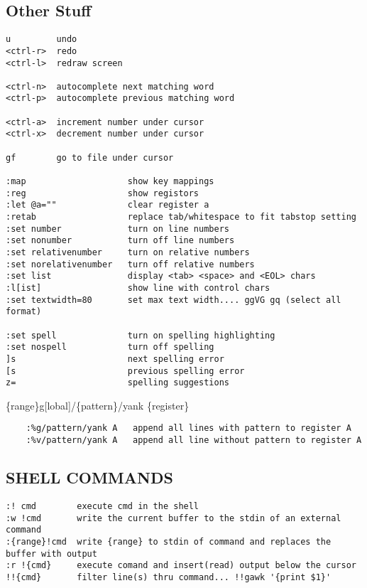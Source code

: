 \documentclass{article}
\begin{document}
\newpage

\subsection{Other Stuff}\label{other-stuff}

\begin{verbatim}
u         undo
<ctrl-r>  redo 
<ctrl-l>  redraw screen

<ctrl-n>  autocomplete next matching word
<ctrl-p>  autocomplete previous matching word

<ctrl-a>  increment number under cursor
<ctrl-x>  decrement number under cursor

gf        go to file under cursor

:map                    show key mappings
:reg                    show registors
:let @a=""              clear register a
:retab                  replace tab/whitespace to fit tabstop setting
:set number             turn on line numbers
:set nonumber           turn off line numbers
:set relativenumber     turn on relative numbers
:set norelativenumber   turn off relative numbers
:set list               display <tab> <space> and <EOL> chars
:l[ist]                 show line with control chars
:set textwidth=80       set max text width.... ggVG gq (select all format)

:set spell              turn on spelling highlighting
:set nospell            turn off spelling
]s                      next spelling error 
[s                      previous spelling error
z=                      spelling suggestions
\end{verbatim}

\{range\}g{[}lobal{]}/\{pattern\}/yank \{register\}

\begin{verbatim}
    :%g/pattern/yank A   append all lines with pattern to register A
    :%v/pattern/yank A   append all line without pattern to register A
\end{verbatim}

\subsection{SHELL COMMANDS}\label{shell-commands}

\begin{verbatim}
:! cmd        execute cmd in the shell
:w !cmd       write the current buffer to the stdin of an external command
:{range}!cmd  write {range} to stdin of command and replaces the buffer with output
:r !{cmd}     execute comand and insert(read) output below the cursor
!!{cmd}       filter line(s) thru command... !!gawk '{print $1}'
\end{verbatim}
\end{document}
